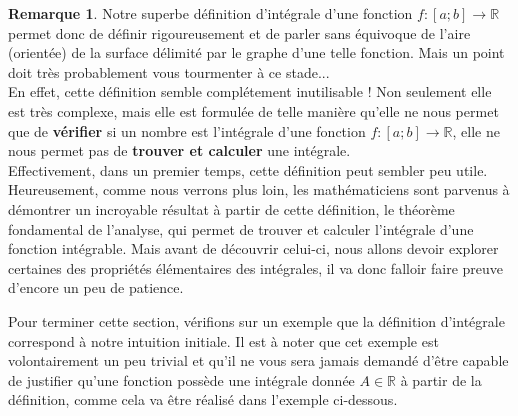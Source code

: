 \documentclass[a4paper,fontsize=13pt]{scrreprt}
\theoremstyle{plain}
\theoremstyle{definition}
\newtheorem{rema}[subsection]{Remarque}
\newcommand{\rr}{\mathbb{R}}
\begin{document}
\newpage
\begin{rema}
Notre superbe définition d'intégrale d'une fonction $f : [a;b] \to \rr$ permet donc de définir rigoureusement et de parler sans équivoque de l'aire (orientée) de la surface délimité par le graphe d'une telle fonction. Mais un point doit très probablement vous tourmenter à ce stade... \\
En effet, cette définition semble complétement inutilisable ! Non seulement elle est très complexe, mais elle est formulée de telle manière qu'elle ne nous permet que de \textbf{vérifier} si un nombre est l'intégrale d'une fonction $f : [a;b] \to \rr$, elle ne nous permet pas de \textbf{trouver et calculer} une intégrale. \\
Effectivement, dans un premier temps, cette définition peut sembler peu utile. Heureusement, comme nous verrons plus loin, les mathématiciens sont parvenus à démontrer un incroyable résultat à partir de cette définition, le théorème fondamental de l'analyse, qui permet de trouver et calculer l'intégrale d'une fonction intégrable. Mais avant de découvrir celui-ci, nous allons devoir explorer certaines des propriétés élémentaires des intégrales, il va donc falloir faire preuve d'encore un peu de patience.
\end{rema}
Pour terminer cette section, vérifions sur un exemple que la définition d'intégrale correspond à notre intuition initiale. Il est à noter que cet exemple est volontairement un peu trivial et qu'il ne vous sera jamais demandé d'être capable de justifier qu'une fonction possède une intégrale donnée $A \in \rr$ à partir de la définition, comme cela va être réalisé dans l'exemple ci-dessous.
\end{document}
